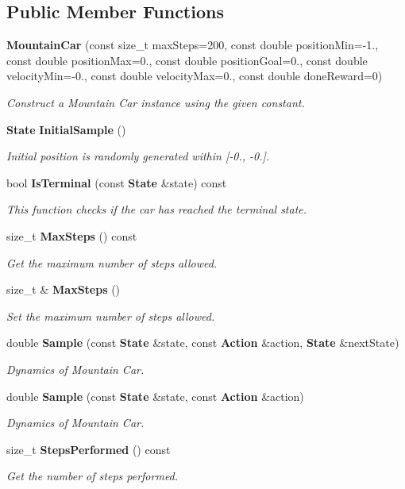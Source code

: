 \subsection*{Public Member Functions}
\begin{DoxyCompactItemize}
\item 
\textbf{ Mountain\+Car} (const size\+\_\+t max\+Steps=200, const double position\+Min=-\/1., const double position\+Max=0., const double position\+Goal=0., const double velocity\+Min=-\/0., const double velocity\+Max=0., const double done\+Reward=0)
\begin{DoxyCompactList}\small\item\em Construct a Mountain Car instance using the given constant. \end{DoxyCompactList}\item 
\textbf{ State} \textbf{ Initial\+Sample} ()
\begin{DoxyCompactList}\small\item\em Initial position is randomly generated within [-\/0., -\/0.]. \end{DoxyCompactList}\item 
bool \textbf{ Is\+Terminal} (const \textbf{ State} \&state) const
\begin{DoxyCompactList}\small\item\em This function checks if the car has reached the terminal state. \end{DoxyCompactList}\item 
size\+\_\+t \textbf{ Max\+Steps} () const
\begin{DoxyCompactList}\small\item\em Get the maximum number of steps allowed. \end{DoxyCompactList}\item 
size\+\_\+t \& \textbf{ Max\+Steps} ()
\begin{DoxyCompactList}\small\item\em Set the maximum number of steps allowed. \end{DoxyCompactList}\item 
double \textbf{ Sample} (const \textbf{ State} \&state, const \textbf{ Action} \&action, \textbf{ State} \&next\+State)
\begin{DoxyCompactList}\small\item\em Dynamics of Mountain Car. \end{DoxyCompactList}\item 
double \textbf{ Sample} (const \textbf{ State} \&state, const \textbf{ Action} \&action)
\begin{DoxyCompactList}\small\item\em Dynamics of Mountain Car. \end{DoxyCompactList}\item 
size\+\_\+t \textbf{ Steps\+Performed} () const
\begin{DoxyCompactList}\small\item\em Get the number of steps performed. \end{DoxyCompactList}\end{DoxyCompactItemize}


